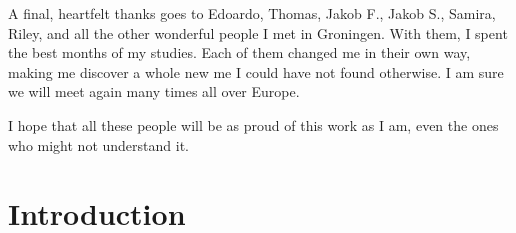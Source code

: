 A final, heartfelt thanks goes to Edoardo, Thomas, Jakob F., Jakob S., Samira, Riley, and all the other wonderful people I met in Groningen. With them, I spent the best months of my studies. Each of them changed me in their own way, making me discover a whole new me I could have not found otherwise. I am sure we will meet again many times all over Europe.

I hope that all these people will be as proud of this work as I am, even the ones who might not understand it.

\clearpage
\begingroup
\hypersetup{linkcolor=black}
\tableofcontents
\listoffigures
\endgroup

\chapter{Introduction}
